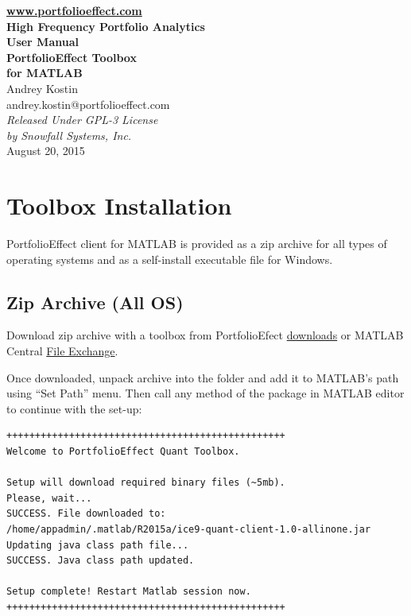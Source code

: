 \documentclass[letterpaper]{report}
\begin{document}
\begin{titlepage}
\begin{center}
\vspace{5cm}
{\bfseries\href{https://www.portfolioeffect.com}{www.portfolioeffect.com} \\
High Frequency Portfolio Analytics\\}
\vspace{8cm}
{\Large \bfseries User Manual \\}
\vspace{0.3cm}
{\Huge\bfseries PortfolioEffect Toolbox \\ for MATLAB \\ }
\vspace{1.5cm}
{Andrey Kostin \\ andrey.kostin@portfolioeffect.com} \\[14pt]
\vfill
\emph{{Released Under GPL-3 License\\ by Snowfall Systems,
Inc.}}\\[2cm]
{August 20, 2015}
\end{center}
\end{titlepage}

\cleardoublepage
{}
{}
\renewcommand{\bibname}{Contents}
\tableofcontents 

\chapter{Toolbox Installation}
PortfolioEffect client for MATLAB is provided as a zip archive for all types of
operating systems and as a self-install executable file for Windows. 

\section{Zip Archive (All OS)}
Download zip archive with a toolbox from
PortfolioEfect
\href{https://www.portfolioeffect.com/docs/platform/quant/downloads}{downloads}
or MATLAB Central
\href{http://www.mathworks.com/matlabcentral/fileexchange}{File Exchange}.

Once downloaded, unpack archive into the folder and add it to
MATLAB's path using ``Set Path'' menu. Then call any method of the package in
MATLAB editor to continue with the set-up:
\begin{lstlisting}
+++++++++++++++++++++++++++++++++++++++++++++++++
Welcome to PortfolioEffect Quant Toolbox.

Setup will download required binary files (~5mb).
Please, wait...
SUCCESS. File downloaded to: 
/home/appadmin/.matlab/R2015a/ice9-quant-client-1.0-allinone.jar
Updating java class path file...
SUCCESS. Java class path updated.

Setup complete! Restart Matlab session now.
+++++++++++++++++++++++++++++++++++++++++++++++++
\end{lstlisting}
\end{document}
